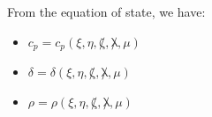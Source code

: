 \documentclass[12pt,a4paper]{article}
\newcommand{\pfird}[2][]{\frac{\partial#1}{\partial#2}}
\begin{document}

From the equation of state, we have:
\begin{itemize}
  \item $c_p = c_p(\xi, \eta, \not\zeta, \not\lambda, \mu)$
  \item $\delta = \delta(\xi, \eta, \not\zeta, \not\lambda, \mu)$
  \item $\rho = \rho(\xi, \eta, \not\zeta, \not\lambda, \mu)$
\end{itemize}
\end{document}
